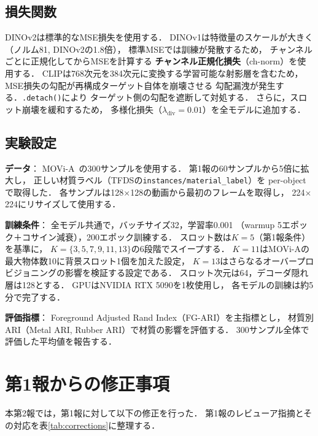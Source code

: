 \documentclass[dvipdfmx,twocolumn]{jarticle}
\begin{document}
\subsection{損失関数}

DINOv2は標準的なMSE損失を使用する．
DINOv1は特徴量のスケールが大きく（ノルム81, DINOv2の1.8倍），
標準MSEでは訓練が発散するため，
チャンネルごとに正規化してからMSEを計算する
\textbf{チャンネル正規化損失}（ch-norm）を使用する．
CLIPは768次元を384次元に変換する学習可能な射影層を含むため，
MSE損失の勾配が再構成ターゲット自体を崩壊させる
勾配漏洩が発生する．\texttt{.detach()}により
ターゲット側の勾配を遮断して対処する．
さらに，スロット崩壊を緩和するため，
多様化損失（$\lambda_\mathrm{div}{=}0.01$）を全モデルに追加する．

\subsection{実験設定}

\textbf{データ}：
MOVi-A~\cite{greff2022}の300サンプルを使用する．
第1報の60サンプルから5倍に拡大し，
正しい材質ラベル（TFDSの\texttt{instances/material\_label}）を
per-objectで取得した．
各サンプルは128$\times$128の動画から最初のフレームを取得し，
224$\times$224にリサイズして使用する．

\textbf{訓練条件}：
全モデル共通で，バッチサイズ32，学習率0.001
（warmup 5エポック＋コサイン減衰），200エポック訓練する．
スロット数は$K{=}5$（第1報条件）を基準に，
$K{=}\{3, 5, 7, 9, 11, 13\}$の6段階でスイープする．
$K{=}11$はMOVi-Aの最大物体数10に背景スロット1個を加えた設定，
$K{=}13$はさらなるオーバープロビジョニングの影響を検証する設定である．
スロット次元は64，デコーダ隠れ層は128とする．
GPUはNVIDIA RTX 5090を1枚使用し，
各モデルの訓練は約5分で完了する．

\textbf{評価指標}：
Foreground Adjusted Rand Index（FG-ARI）を主指標とし，
材質別ARI（Metal ARI, Rubber ARI）で材質の影響を評価する．
300サンプル全体で評価した平均値を報告する．

\section{第1報からの修正事項}
\label{sec:corrections}

本第2報では，第1報に対して以下の修正を行った．
第1報のレビューア指摘とその対応を表\ref{tab:corrections}に整理する．
\end{document}
